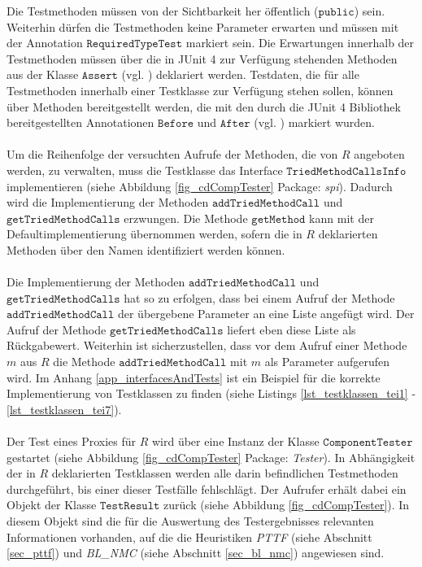 \noindent
Die Testmethoden müssen von der Sichtbarkeit her öffentlich ($\texttt{public}$) sein. Weiterhin dürfen die Testmethoden keine Parameter erwarten und müssen mit der Annotation $\texttt{RequiredTypeTest}$ markiert sein. Die Erwartungen innerhalb der Testmethoden müssen über die in JUnit 4 zur Verfügung stehenden Methoden aus der Klasse $\texttt{Assert}$ (vgl. \cite{junit_api}) deklariert werden. Testdaten, die für alle Testmethoden innerhalb einer Testklasse zur Verfügung stehen sollen, können über Methoden bereitgestellt werden, die mit den durch die JUnit 4 Bibliothek bereitgestellten Annotationen $\texttt{Before}$ und $\texttt{After}$ (vgl. \cite{junit_api}) markiert wurden.
\\\\
Um die Reihenfolge der versuchten Aufrufe der Methoden, die von $R$ angeboten werden, zu verwalten, muss die Testklasse das Interface $\texttt{TriedMethodCallsInfo}$ implementieren (siehe Abbildung \ref{fig_cdCompTester} Package: \emph{spi}). Dadurch wird die Implementierung der Methoden $\texttt{addTriedMethodCall}$ und $\texttt{getTriedMethodCalls}$ erzwungen. Die Methode $\texttt{getMethod}$ kann mit der Defaultimplementierung übernommen werden, sofern die in $R$ deklarierten Methoden über den Namen identifiziert werden können.
\\\\
Die Implementierung der Methoden $\texttt{addTriedMethodCall}$ und $\texttt{getTriedMethodCalls}$ hat so zu erfolgen, dass bei einem Aufruf der Methode $\texttt{addTriedMethodCall}$ der übergebene Parameter an eine Liste angefügt wird. Der Aufruf der Methode $\texttt{getTriedMethodCalls}$ liefert eben diese Liste als Rückgabewert. Weiterhin ist sicherzustellen, dass vor dem Aufruf einer Methode $m$ aus $R$ die Methode $\texttt{addTriedMethodCall}$ mit $m$ als Parameter aufgerufen wird. Im Anhang \ref{app_interfacesAndTests} ist ein Beispiel für die korrekte Implementierung von Testklassen zu finden (siehe Listings \ref{lst_testklassen_tei1} - \ref{lst_testklassen_tei7}).
\\\\
Der Test eines Proxies für $R$ wird über eine Instanz der Klasse $\texttt{ComponentTester}$ gestartet (siehe Abbildung \ref{fig_cdCompTester} Package: \emph{Tester}). In Abhängigkeit der in $R$ deklarierten Testklassen werden alle darin befindlichen Testmethoden durchgeführt, bis einer dieser Testfälle fehlschlägt. Der Aufrufer erhält dabei ein Objekt der Klasse $\texttt{TestResult}$ zurück (siehe Abbildung \ref{fig_cdCompTester}). In diesem Objekt sind die für die Auswertung des Testergebnisses relevanten Informationen vorhanden, auf die die Heuristiken \emph{PTTF} (siehe Abschnitt \ref{sec_pttf}) und \emph{BL\_NMC} (siehe Abschnitt \ref{sec_bl_nmc}) angewiesen sind.
